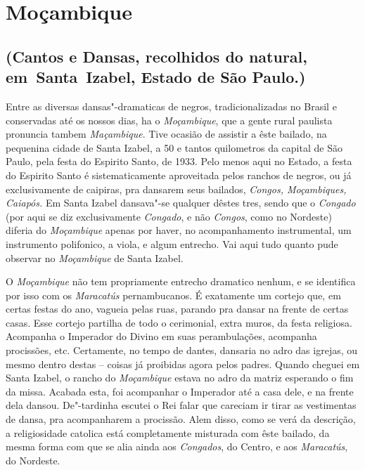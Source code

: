 \chapter{Moçambique}

\section{(Cantos e Dansas, recolhidos do natural, em~Santa~Izabel, Estado
de São Paulo.)}

Entre as diversas dansas"-dramaticas de negros, tradicionalizadas no
Brasil e conservadas até os nossos dias, ha o \emph{Moçambique}, que a
gente rural paulista pronuncia tambem \emph{Maçambique}. Tive ocasião de
assistir a êste bailado, na pequenina cidade de Santa Izabel, a 50 e
tantos quilometros da capital de São Paulo, pela festa do Espirito
Santo, de 1933. Pelo menos aqui no Estado, a festa do Espirito Santo é
sistematicamente aproveitada pelos ranchos de negros, ou já
exclusivamente de caipiras, pra dansarem seus bailados, \emph{Congos,
Moçambiques, Caiapós.} Em Santa Izabel dansava"-se qualquer dêstes tres,
sendo que o \emph{Congado} (por aqui se diz exclusivamente
\emph{Congado}, e não \emph{Congos}, como no Nordeste) diferia do
\emph{Moçambique} apenas por haver, no acompanhamento instrumental, um
instrumento polifonico, a viola, e algum entrecho. Vai aqui tudo quanto
pude observar no \emph{Moçambique} de Santa Izabel.

O \emph{Moçambique} não tem propriamente entrecho dramatico nenhum, e se
identifica por isso com os \emph{Maracatús} pernambucanos. É exatamente
um cortejo que, em certas festas do ano, vagueia pelas ruas, parando pra
dansar na frente de certas casas. Esse cortejo partilha de todo o
cerimonial, extra muros, da festa religiosa. Acompanha o Imperador do
Divino em suas perambulações, acompanha procissões, etc. Certamente, no
tempo de dantes, dansaria no adro das igrejas, ou mesmo dentro destas --
coisas já proibidas agora pelos padres. Quando cheguei em Santa Izabel,
o rancho do \emph{Moçambique} estava no adro da matriz esperando o fim
da missa. Acabada esta, foi acompanhar o Imperador até a casa dele, e na
frente dela dansou. De"-tardinha escutei o Rei falar que careciam ir
tirar as vestimentas de dansa, pra acompanharem a procissão. Alem disso,
como se verá da descrição, a religiosidade catolica está completamente
misturada com êste bailado, da mesma forma com que se alia ainda aos
\emph{Congados}, do Centro, e aos \emph{Maracatús}, do Nordeste.

